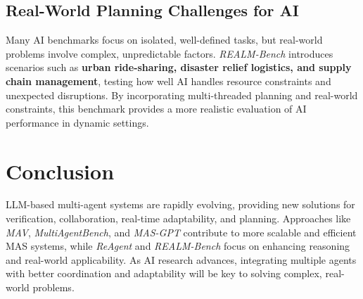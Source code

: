\documentclass[a4paper,12pt]{article}
\begin{document}
\subsection{Real-World Planning Challenges for AI}  
Many AI benchmarks focus on isolated, well-defined tasks, but real-world problems involve complex, unpredictable factors. \textit{REALM-Bench} introduces scenarios such as \textbf{urban ride-sharing, disaster relief logistics, and supply chain management}, testing how well AI handles resource constraints and unexpected disruptions. By incorporating multi-threaded planning and real-world constraints, this benchmark provides a more realistic evaluation of AI performance in dynamic settings.

\section{Conclusion}  
LLM-based multi-agent systems are rapidly evolving, providing new solutions for verification, collaboration, real-time adaptability, and planning. Approaches like \textit{MAV}, \textit{MultiAgentBench}, and \textit{MAS-GPT} contribute to more scalable and efficient MAS systems, while \textit{ReAgent} and \textit{REALM-Bench} focus on enhancing reasoning and real-world applicability. As AI research advances, integrating multiple agents with better coordination and adaptability will be key to solving complex, real-world problems.
\end{document}
